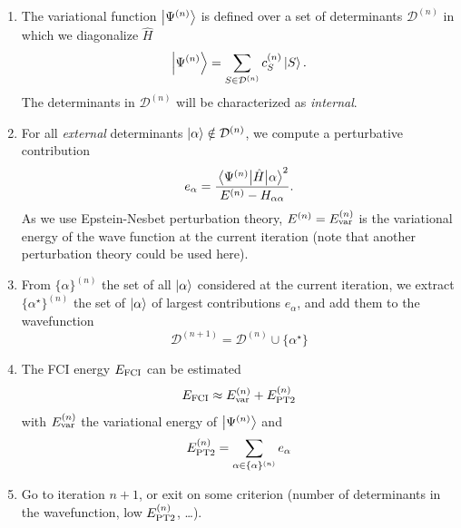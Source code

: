 \documentclass[./thesis.tex]{subfiles}
\begin{document}
\begin{enumerate}
\item

The variational function $\ket {\Psi^{(n)}}$ is defined over a set of determinants $  \mathcal{D}^{(n)}$ in which we diagonalize $\widehat{H}$
\begin{equation}
\ket{\Psi^{(n)}} = \sum_{S \in \mathcal{D}^{(n)}} c_S^{(n)} \ket{S}.
\end{equation}
The determinants in $\mathcal{D}^{(n)}$ will be characterized as \emph{internal}.

\item
For all \emph{external} determinants ${\ket{\alpha}} \notin \mathcal{D}^{(n)}$, we compute a perturbative contribution
\begin{equation}
e_\alpha = \frac{\mel{\Psi^{(n)}}{\hat{H}}{\alpha}^2}{E^{(n)} - H_{\alpha \alpha}}.
\end{equation}
As we use Epstein-Nesbet perturbation theory, $E^{(n)}=E_\text{var}^{(n)}$ is the variational energy of the wave  function at the current iteration (note that another perturbation theory could be used here).

\item
From $\{ \alpha \}^{(n)}$ the set of all ${\ket{\alpha}}$ considered at the current iteration, we extract $\{ \alpha^\star \}^{(n)}$ the set of ${\ket{\alpha}}$ of largest contributions $e_\alpha$, and add them to the wavefunction
\begin{equation}
\mathcal{D}^{(n+1)} = \mathcal{D}^{(n)} \cup \{ \alpha^\star \}
\end{equation}

\item
The FCI energy $E_\text{FCI}$ can be estimated
\begin{equation}
E_\text{FCI} \approx E_\text{var}^{(n)} + E_\text{PT2}^{(n)}
\end{equation}
with $E_\text{var}^{(n)}$ the variational energy of $\ket {\Psi^{(n)}}$ and
\begin{equation}
E_\text{PT2}^{(n)} = \sum_{\alpha \in \{\alpha \}^{(n)}} e_\alpha
\end{equation}

\item
Go to iteration $n+1$, or exit on some criterion (number of determinants in the wavefunction, low $E_\text{PT2}^{(n)}$, \dots).

\end{enumerate}
\end{document}
